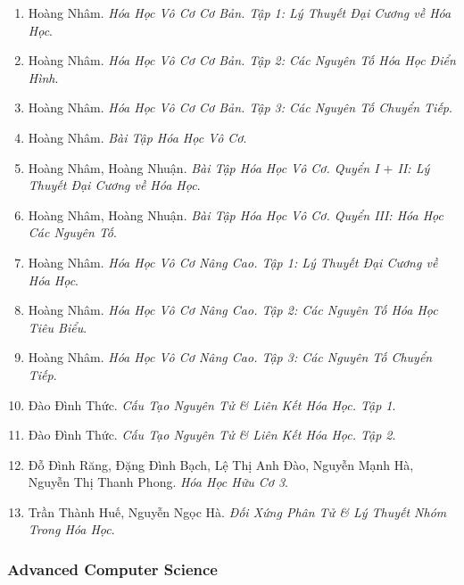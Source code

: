 \documentclass{article}
\begin{document}
\begin{enumerate}
	\item Hoàng Nhâm. {\it Hóa Học Vô Cơ Cơ Bản. Tập 1: Lý Thuyết Đại Cương về Hóa Học}.
	
	\item Hoàng Nhâm. {\it Hóa Học Vô Cơ Cơ Bản. Tập 2: Các Nguyên Tố Hóa Học Điển Hình}.
	
	\item Hoàng Nhâm. {\it Hóa Học Vô Cơ Cơ Bản. Tập 3: Các Nguyên Tố Chuyển Tiếp}.
	
	\item Hoàng Nhâm. {\it Bài Tập Hóa Học Vô Cơ}.
	
	\item Hoàng Nhâm, Hoàng Nhuận. {\it Bài Tập Hóa Học Vô Cơ. Quyển I $+$ II: Lý Thuyết Đại Cương về Hóa Học}.
	
	\item Hoàng Nhâm, Hoàng Nhuận. {\it Bài Tập Hóa Học Vô Cơ. Quyển III: Hóa Học Các Nguyên Tố}.
	
	\item Hoàng Nhâm. {\it Hóa Học Vô Cơ Nâng Cao. Tập 1: Lý Thuyết Đại Cương về Hóa Học}.
	
	\item Hoàng Nhâm. {\it Hóa Học Vô Cơ Nâng Cao. Tập 2: Các Nguyên Tố Hóa Học Tiêu Biểu}.
	
	\item Hoàng Nhâm. {\it Hóa Học Vô Cơ Nâng Cao. Tập 3: Các Nguyên Tố Chuyển Tiếp}.
	
	\item Đào Đình Thức. {\it Cấu Tạo Nguyên Tử \& Liên Kết Hóa Học. Tập 1}.
	
	\item Đào Đình Thức. {\it Cấu Tạo Nguyên Tử \& Liên Kết Hóa Học. Tập 2}.
	
	\item Đỗ Đình Răng, Đặng Đình Bạch, Lệ Thị Anh Đào, Nguyễn Mạnh Hà, Nguyễn Thị Thanh Phong. {\it Hóa Học Hữu Cơ 3}.
	
	\item Trần Thành Huế, Nguyễn Ngọc Hà. {\it Đối Xứng Phân Tử \& Lý Thuyết Nhóm Trong Hóa Học}.
\end{enumerate}


\subsubsection{Advanced Computer Science}
\end{document}
